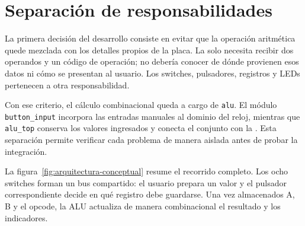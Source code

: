 
\section{Separación de responsabilidades}

La primera decisión del desarrollo consiste en evitar que la operación
aritmética quede mezclada con los detalles propios de la placa. La
 solo necesita recibir dos operandos y un código de
operación; no debería conocer de dónde provienen esos datos ni cómo
se presentan al usuario. Los switches, pulsadores, registros y LEDs
pertenecen a otra responsabilidad.

Con ese criterio, el cálculo combinacional queda a cargo de
\texttt{alu}. El módulo \texttt{button\_input} incorpora las entradas
manuales al dominio del reloj, mientras que \texttt{alu\_top} conserva
los valores ingresados y conecta el conjunto con la .
Esta separación permite verificar cada problema de manera aislada
antes de probar la integración.

La figura~\ref{fig:arquitectura-conceptual} resume el recorrido
completo. Los ocho switches forman un bus compartido: el usuario
prepara un valor y el pulsador correspondiente decide en qué registro
debe guardarse. Una vez almacenados A, B y el opcode, la ALU
actualiza de manera combinacional el resultado y los indicadores.

